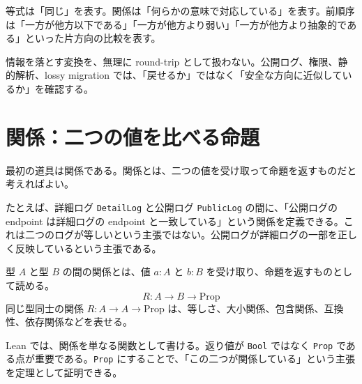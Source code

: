 \begin{intuitionbox}
等式は「同じ」を表す。関係は「何らかの意味で対応している」を表す。前順序は「一方が他方以下である」「一方が他方より弱い」「一方が他方より抽象的である」といった片方向の比較を表す。
\end{intuitionbox}

\begin{softwarebox}
情報を落とす変換を、無理に round-trip として扱わない。公開ログ、権限、静的解析、lossy migration では、「戻せるか」ではなく「安全な方向に近似しているか」を確認する。
\end{softwarebox}


\section{関係：二つの値を比べる命題}

最初の道具は関係である。関係とは、二つの値を受け取って命題を返すものだと考えればよい。

たとえば、詳細ログ \texttt{DetailLog} と公開ログ \texttt{PublicLog} の間に、「公開ログの endpoint は詳細ログの endpoint と一致している」という関係を定義できる。これは二つのログが等しいという主張ではない。公開ログが詳細ログの一部を正しく反映しているという主張である。

\begin{definitionbox}
型 \(A\) と型 \(B\) の間の関係とは、値 \(a : A\) と \(b : B\) を受け取り、命題を返すものとして読める。
\[
  R : A \to B \to \mathrm{Prop}
\]
同じ型同士の関係 \(R : A \to A \to \mathrm{Prop}\) は、等しさ、大小関係、包含関係、互換性、依存関係などを表せる。
\end{definitionbox}

\begin{leanbox}
Lean では、関係を単なる関数として書ける。返り値が \texttt{Bool} ではなく \texttt{Prop} である点が重要である。\texttt{Prop} にすることで、「この二つが関係している」という主張を定理として証明できる。
\end{leanbox}

